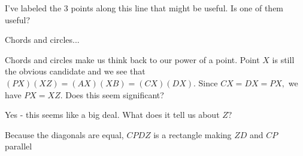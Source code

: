 I've labeled the 3 points along this line that might be useful. Is one of them useful?









Chords and circles...

Chords and circles make us think back to our power of a point. Point $X$ is still the obvious candidate and we see that $(PX)(XZ) = (AX)(XB) = (CX)(DX).$ Since $CX = DX = PX,$ we have $PX = XZ.$ Does this seem significant?




Yes - this seems like a big deal. What does it tell us about $Z?$










Because the diagonals are equal, $CPDZ$ is a rectangle making $ZD$ and $CP$ parallel

